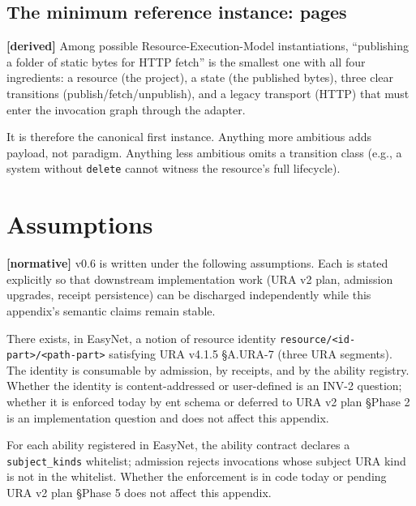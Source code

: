 \documentclass[11pt,a4paper]{article}
\newcommand{\normsv}{\textcolor{normativecolor}{\textbf{[normative]}}\xspace}
\newcommand{\derived}{\textcolor{derivedcolor}{\textbf{[derived]}}\xspace}
\theoremstyle{definition}
\begin{document}
\subsection{The minimum reference instance: pages}

\derived{} Among possible Resource-Execution-Model
instantiations, ``publishing a folder of static bytes for HTTP
fetch'' is the smallest one with all four ingredients: a
resource (the project), a state (the published bytes), three
clear transitions (publish/fetch/unpublish), and a legacy
transport (HTTP) that must enter the invocation graph through
the adapter.

It is therefore the canonical first instance. Anything more
ambitious adds payload, not paradigm. Anything less ambitious
omits a transition class (e.g., a system without \texttt{delete}
cannot witness the resource's full lifecycle).

\section{Assumptions}
\label{sec:assumptions}

\normsv{} v0.6 is written under the following assumptions. Each
is stated explicitly so that downstream implementation work
(URA v2 plan, admission upgrades, receipt persistence) can be
discharged independently while this appendix's semantic claims
remain stable.

\begin{assumptionbox}
There exists, in EasyNet, a notion of resource identity
\texttt{resource/<id-part>/<path-part>} satisfying URA v4.1.5
§A.URA-7 (three URA segments). The identity is consumable by
admission, by receipts, and by the ability registry. Whether
the identity is content-addressed or user-defined is an
INV-2 question; whether it is enforced today by ent schema or
deferred to URA v2 plan §Phase 2 is an implementation
question and does not affect this appendix.
\end{assumptionbox}

\begin{assumptionbox}
For each ability registered in EasyNet, the ability contract
declares a \texttt{subject\_kinds} whitelist; admission rejects
invocations whose subject URA kind is not in the whitelist.
Whether the enforcement is in code today or pending URA v2 plan
§Phase 5 does not affect this appendix.
\end{assumptionbox}
\end{document}
